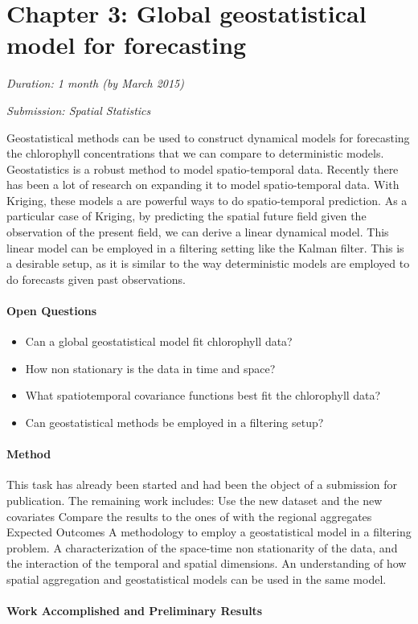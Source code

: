 \section{Chapter 3: Global geostatistical model for forecasting}

\noindent
\emph{Duration: 1 month (by March 2015)}

\noindent
\emph{Submission: Spatial Statistics}

Geostatistical methods can be used to construct dynamical models for forecasting the chlorophyll concentrations that we can compare to deterministic models. Geostatistics is a robust method to model spatio-temporal data. Recently there has been a lot of research on expanding it to model spatio-temporal data. With Kriging, these models a are powerful ways to do spatio-temporal prediction. As a particular case of Kriging, by predicting the spatial future field given the observation of the present field, we can derive a linear dynamical model. This linear model can be employed in a filtering setting like the Kalman filter. This is a desirable setup, as it is similar to the way deterministic models are employed to do forecasts given past observations. 

\paragraph{Open Questions}

\begin{itemize}
\item Can a global geostatistical model fit chlorophyll data?
\item How non stationary is the data in time and space?
\item What spatiotemporal covariance functions best fit the chlorophyll data?
\item Can geostatistical methods be employed in a filtering setup?
\end{itemize}

\paragraph{Method}

This task has already been started and had been the object of a submission for publication. The remaining work includes:
Use the new dataset and the new covariates
Compare the results to the ones of with the regional aggregates
Expected Outcomes
A methodology to employ a geostatistical model in a filtering problem.
A characterization of the space-time non stationarity of the data, and the interaction of the temporal and spatial dimensions.
An understanding of how spatial aggregation and geostatistical models can be used in the same model. 

\paragraph{Work Accomplished and Preliminary Results}


